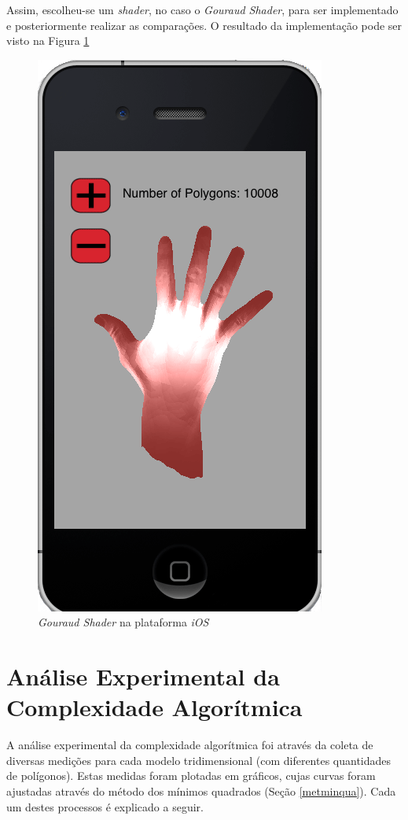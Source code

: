 	Assim, escolheu-se um \textit{shader}, no caso o \textit{Gouraud Shader}, para ser implementado e posteriormente realizar as comparações. O resultado da implementação pode ser visto na Figura \ref{gouraud_ios}

	\begin{figure}[ht]
	\centering
		\includegraphics[keepaspectratio=true,scale=0.5]{figuras/gouraud_ios.png}
	\caption{\textit{Gouraud Shader} na plataforma \textit{iOS}}
	\label{gouraud_ios}
	\end{figure}

\section{Análise Experimental da Complexidade Algorítmica}

	A análise experimental da complexidade algorítmica foi através da coleta de diversas medições para cada modelo tridimensional (com diferentes quantidades de polígonos). Estas medidas foram plotadas em gráficos, cujas curvas foram ajustadas através do método dos mínimos quadrados (Seção \ref{metminqua}). Cada um destes processos é explicado a seguir.


